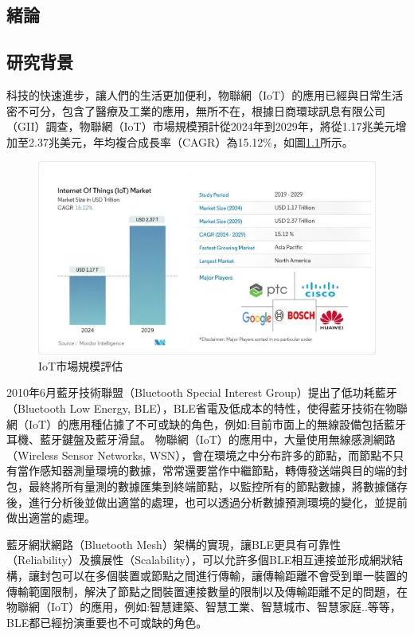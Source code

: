\begin{ZhChapter}

\chapter{緒論}

\section{研究背景}

科技的快速進步，讓人們的生活更加便利，物聯網（IoT）的應用已經與日常生活密不可分，包含了醫療及工業的應用，無所不在，\cite{mordor2024iot}根據日商環球訊息有限公司（GII）調查，物聯網（IoT）市場規模預計從2024年到2029年，將從1.17兆美元增加至2.37兆美元，年均複合成長率（CAGR）為15.12\%，如圖\ref{fig: IoT市場規模評估}所示。

\begin{figure}[H]
    \centering
    \includegraphics[width = 1\textwidth]{image/market_research.jpg}
    \caption{IoT市場規模評估\cite{mordor2024iot}}
    \label{fig: IoT市場規模評估}
\end{figure}

2010年6月藍牙技術聯盟（Bluetooth Special Interest Group）提出了低功耗藍牙（Bluetooth Low Energy, BLE），BLE省電及低成本的特性，使得藍牙技術在物聯網（IoT）的應用種佔據了不可或缺的角色，例如:目前市面上的無線設備包括藍牙耳機、藍牙鍵盤及藍牙滑鼠。
物聯網（IoT）的應用中，大量使用無線感測網路（Wireless Sensor Networks, WSN），會在環境之中分布許多的節點，而節點不只有當作感知器測量環境的數據，常常還要當作中繼節點，轉傳發送端與目的端的封包，最終將所有量測的數據匯集到終端節點，以監控所有的節點數據，將數據儲存後，進行分析後並做出適當的處理，也可以透過分析數據預測環境的變化，並提前做出適當的處理。

藍牙網狀網路（Bluetooth Mesh）架構的實現，讓BLE更具有可靠性（Reliability）及擴展性（Scalability），可以允許多個BLE相互連接並形成網狀結構，讓封包可以在多個裝置或節點之間進行傳輸，讓傳輸距離不會受到單一裝置的傳輸範圍限制，解決了節點之間裝置連接數量的限制以及傳輸距離不足的問題，在物聯網（IoT）的應用，例如:智慧建築、智慧工業、智慧城市、智慧家庭..等等，BLE都已經扮演重要也不可或缺的角色。
	

\end{ZhChapter}
